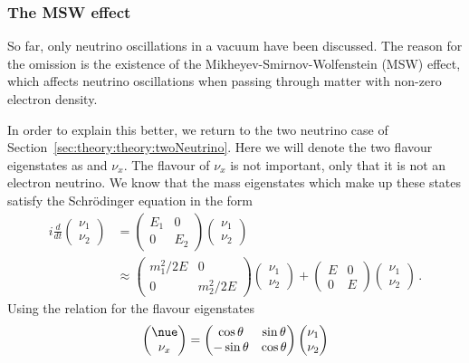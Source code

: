 \subsubsection{The MSW effect}
\label{sec:theory:theory:msw}
So far, only neutrino oscillations in a vacuum have been discussed.
The reason for the omission is the existence of the Mikheyev-Smirnov-Wolfenstein (MSW) effect, which affects neutrino oscillations when passing through matter with non-zero electron density.

In order to explain this better, we return to the two neutrino case of Section~\ref{sec:theory:theory:twoNeutrino}.
Here we will denote the two flavour eigenstates as \nue and $\nu_{x}$.
The flavour of $\nu_{x}$ is not important, only that it is not an electron neutrino.
We know that the mass eigenstates which make up these states satisfy the Schr\"odinger equation in the form
\begin{align}
  i \frac{d}{dt}
  \begin{pmatrix}
    \nu_{1} \\
    \nu_{2}
  \end{pmatrix}
  &=
  \begin{pmatrix}
    E_{1} & 0 \\
    0     & E_{2}
  \end{pmatrix}
  \begin{pmatrix}
    \nu_{1} \\
    \nu_{2}
  \end{pmatrix} \\
  & \approx
  \begin{pmatrix}
    m_{1}^{2}/2E & 0 \\
    0 & m_{2}^{2}/2E
  \end{pmatrix}
  \begin{pmatrix}
    \nu_{1} \\
    \nu_{2}
  \end{pmatrix}
  +
  \begin{pmatrix}
    E & 0 \\
    0 & E 
  \end{pmatrix}
  \begin{pmatrix}
    \nu_{1} \\
    \nu_{2}
  \end{pmatrix} \, .  
\end{align}
Using the relation for the flavour eigenstates
\begin{equation}
  \begin{pmatrix}
    \nue \\
    \nu_{x}
  \end{pmatrix}
  =
  \begin{pmatrix}
    \cos\theta & \sin\theta \\
    -\sin\theta & \cos\theta
  \end{pmatrix}
  \begin{pmatrix}
    \nu_{1} \\
    \nu_{2}
  \end{pmatrix}
\end{equation}
